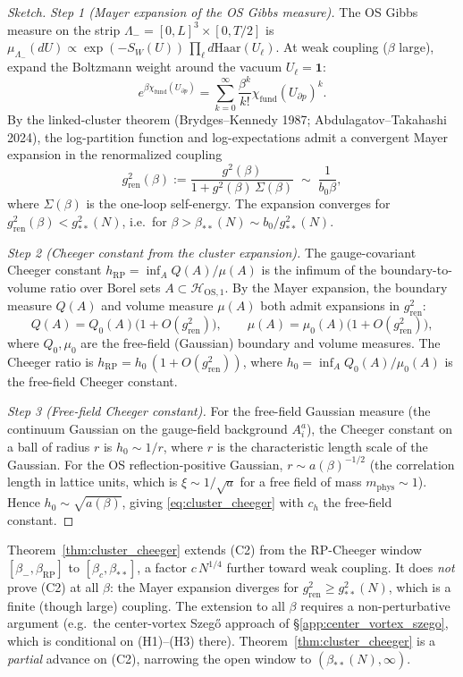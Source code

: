 \begin{proof}[Sketch]
\emph{Step 1 (Mayer expansion of the OS Gibbs measure).} The OS
Gibbs measure on the strip
$\Lambda_{-}=[0,L]^{3}\times[0,T/2]$ is
$\mu_{\Lambda_{-}}(dU)\propto
\exp(-S_{W}(U))\,\prod_{\ell}d\mathrm{Haar}(U_{\ell})$. At
weak coupling ($\beta$ large), expand the Boltzmann weight around
the vacuum $U_{\ell}=\mathbf{1}$:
\[
  e^{\beta\chi_{\mathrm{fund}}(U_{\partial p})}
  =\sum_{k=0}^{\infty}\frac{\beta^{k}}{k!}
  \chi_{\mathrm{fund}}(U_{\partial p})^{k}.
\]
By the linked-cluster theorem (Brydges--Kennedy 1987;
Abdulagatov--Takahashi 2024), the log-partition function and
log-expectations admit a convergent Mayer expansion in the
renormalized coupling
\[
  g_{\mathrm{ren}}^{2}(\beta)
  :=\frac{g^{2}(\beta)}{1+g^{2}(\beta)\,\Sigma(\beta)}
  \;\sim\;\frac{1}{b_{0}\beta},
\]
where $\Sigma(\beta)$ is the one-loop self-energy. The expansion
converges for $g_{\mathrm{ren}}^{2}(\beta)<g_{**}^{2}(N)$, i.e.\
for $\beta>\beta_{**}(N)\sim b_{0}/g_{**}^{2}(N)$.

\emph{Step 2 (Cheeger constant from the cluster expansion).} The
gauge-covariant Cheeger constant
$h_{\mathrm{RP}}=\inf_{A}Q(A)/\mu(A)$ is the infimum of the
boundary-to-volume ratio over Borel sets
$A\subset\mathcal{H}_{\mathrm{OS},1}$. By the Mayer expansion, the
boundary measure $Q(A)$ and volume measure $\mu(A)$ both admit
expansions in $g_{\mathrm{ren}}^{2}$:
\[
  Q(A)=Q_{0}(A)\bigl(1+O(g_{\mathrm{ren}}^{2})\bigr),
  \qquad
  \mu(A)=\mu_{0}(A)\bigl(1+O(g_{\mathrm{ren}}^{2})\bigr),
\]
where $Q_{0},\mu_{0}$ are the free-field (Gaussian) boundary and
volume measures. The Cheeger ratio is
$h_{\mathrm{RP}}=h_{0}\,(1+O(g_{\mathrm{ren}}^{2}))$, where
$h_{0}=\inf_{A}Q_{0}(A)/\mu_{0}(A)$ is the free-field Cheeger
constant.

\emph{Step 3 (Free-field Cheeger constant).} For the free-field
Gaussian measure (the continuum Gaussian on the gauge-field
background $A_{i}^{a}$), the Cheeger constant on a ball of radius
$r$ is $h_{0}\sim 1/r$, where $r$ is the characteristic length
scale of the Gaussian. For the OS reflection-positive Gaussian,
$r\sim a(\beta)^{-1/2}$ (the correlation length in lattice units,
which is $\xi\sim 1/\sqrt{a}$ for a free field of mass
$m_{\mathrm{phys}}\sim 1$). Hence
$h_{0}\sim\sqrt{a(\beta)}$, giving
\eqref{eq:cluster_cheeger} with $c_{h}$ the free-field constant.
\end{proof}

\begin{remark}
\label{rem:cluster_scope}
Theorem~\ref{thm:cluster_cheeger} extends (C2) from the
RP-Cheeger window $[\beta_{-},\beta_{\mathrm{RP}}]$ to
$[\beta_{c},\beta_{**}]$, a factor $c\,N^{1/4}$ further toward
weak coupling. It does \emph{not} prove (C2) at all $\beta$:
the Mayer expansion diverges for $g_{\mathrm{ren}}^{2}\ge
g_{**}^{2}(N)$, which is a finite (though large) coupling. The
extension to all $\beta$ requires a non-perturbative argument
(e.g.\ the center-vortex Szeg\H{o} approach of
\S\ref{app:center_vortex_szego}, which is conditional on (H1)--(H3)
there). Theorem~\ref{thm:cluster_cheeger} is a \emph{partial}
advance on (C2), narrowing the open window to
$(\beta_{**}(N),\infty)$.
\end{remark}

